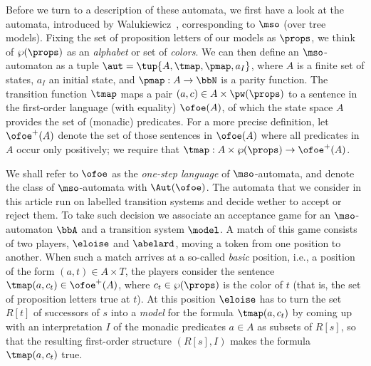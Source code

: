 Before we turn to a description of these automata, we first have a look at the
automata, introduced by Walukiewicz~\cite{Walukiewicz96}, corresponding to $\mso$
(over tree models).
Fixing the set of proposition letters of our models as $\props$, we think of
$\wp(\props)$ as an \emph{alphabet} or set of \emph{colors}.
We can then define an $\mso$-automaton as a tuple $\aut = \tup{A,\tmap,\pmap,a_I}$, where $A$ is a finite set of states, $a_I$ an initial state, and $\pmap:
A \to \bbN$ is a parity function.
%
The transition function $\tmap$ maps a pair $(a,c) \in A \times \pw(\props)$ to a
sentence in the first-order language (with equality) $\ofoe(A)$, of which the
state space $A$ provides the set of (monadic) predicates.
%
For a more precise definition, let $\ofoe^+(A)$ denote the set of
those sentences in $\ofoe(A)$ where all predicates in $A$ occur only positively;
we require that $\tmap: A \times \wp(\props) \to \ofoe^+(A)$.

We shall refer to $\ofoe$ as the \emph{one-step language} of $\mso$-automata,
and denote the class of $\mso$-automata with $\Aut(\ofoe)$.
The automata that we consider in this article run on labelled transition systems
and decide wether to accept or reject them. To take such decision we associate
an acceptance game for an
$\mso$-automaton $\bbA$ and a transition system $\model$.
A match of this game consists of two players, $\eloise$ and $\abelard$, moving a
token from one position to another.
When such a match arrives at a so-called \emph{basic} position, i.e., a
position of the form $(a,t) \in A \times T$, the players consider the
sentence $\tmap(a,c_{t}) \in \ofoe^+(A)$, where $c_{t} \in \wp(\props)$ is the color
of $t$ (that is, the set of proposition letters true at $t$).
At this position $\eloise$ has to turn the set $R[t]$ of successors of
$s$ into a \emph{model} for the formula $\tmap(a,c_{t})$ by coming up with an
interpretation $I$ of the monadic predicates $a \in A$ as subsets of $R[s]$,
so that the resulting first-order structure $(R[s],I)$ makes the
formula $\tmap(a,c_{t})$ true.


